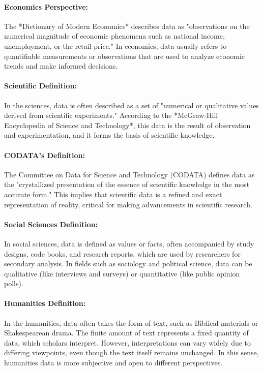 \documentclass[12pt, oneside]{book}
\begin{document}
\paragraph{Economics Perspective:}
The *Dictionary of Modern Economics* describes data as "observations on the numerical magnitude of economic phenomena such as national income, unemployment, or the retail price." In economics, data usually refers to quantifiable measurements or observations that are used to analyze economic trends and make informed decisions.\\
\paragraph{Scientific Definition:}
In the sciences, data is often described as a set of "numerical or qualitative values derived from scientific experiments." According to the *McGraw-Hill Encyclopedia of Science and Technology*, this data is the result of observation and experimentation, and it forms the basis of scientific knowledge.\\
\paragraph{CODATA's Definition:}
The Committee on Data for Science and Technology (CODATA) defines data as the "crystallized presentation of the essence of scientific knowledge in the most accurate form." This implies that scientific data is a refined and exact representation of reality, critical for making advancements in scientific research.\\
\paragraph{Social Sciences Definition:}
In social sciences, data is defined as values or facts, often accompanied by study designs, code books, and research reports, which are used by researchers for secondary analysis. In fields such as sociology and political science, data can be qualitative (like interviews and surveys) or quantitative (like public opinion polls).\\
\paragraph{Humanities Definition:}
In the humanities, data often takes the form of text, such as Biblical materials or Shakespearean drama. The finite amount of text represents a fixed quantity of data, which scholars interpret. However, interpretations can vary widely due to differing viewpoints, even though the text itself remains unchanged. In this sense, humanities data is more subjective and open to different perspectives.\\
\end{document}
